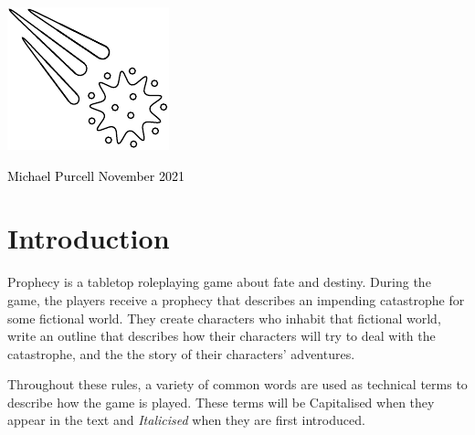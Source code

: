 \documentclass[12pt, a5paper, parskip=half-]{scrartcl}
\begin{document}
\begin{titlepage}
		\enlargethispage{5\baselineskip}

         \setmainfont{Cinzel Decorative}
	    \centering{
			{\fontsize{60}{72}\selectfont
			{\textcolor{black}{pROpHecY}}}
		}


		\setmainfont{URWClassico}
		\vspace{10mm}
		\centering{\Large{{\textcolor{black}
{A tabletop roleplaying game\\ \smallskip about fate and destiny}}}}


\includegraphics[scale=3.55]{Images/comet_diagram.pdf}

		\vfill
		\raggedright{\Large{{\textcolor{black}{Michael Purcell \hfill November 2021}}}}

\end{titlepage}



\setmainfont{URWClassico}
\normalsize
\raggedright
\section*{Introduction}
Prophecy is a tabletop roleplaying game about fate and destiny. During the game, the players receive a prophecy that describes an impending catastrophe for some fictional world. They create characters who inhabit that fictional world, write an outline that describes how their characters will try to deal with the catastrophe, and the the story of their characters' adventures.

Throughout these rules, a variety of common words are used as technical terms to describe how the game is played. These terms will be Capitalised when they appear in the text and \emph{Italicised} when they are first introduced.
\end{document}
